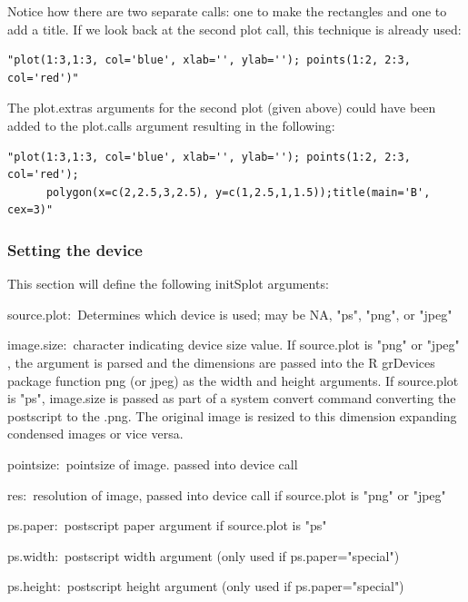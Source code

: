 \documentclass[]{article}
\begin{document}
\indent Notice how there are two separate calls: one to make the rectangles and one to add a title.  If we look back at the second plot call, this technique is already used:

\begin{verbatim}
"plot(1:3,1:3, col='blue', xlab='', ylab=''); points(1:2, 2:3, col='red')"
\end{verbatim}

\indent The plot.extras arguments for the second plot (given above) could have been added to the plot.calls argument resulting in the following:

\begin{verbatim}
"plot(1:3,1:3, col='blue', xlab='', ylab=''); points(1:2, 2:3, col='red');
      polygon(x=c(2,2.5,3,2.5), y=c(1,2.5,1,1.5));title(main='B', cex=3)"
\end{verbatim}



\subsubsection{Setting the device}

This section will define the following initSplot arguments:

\begin{description}
   \item{source.plot:~}{Determines which device is used; may be NA, "ps", "png", or "jpeg"}
   \item{image.size:~}{character indicating device size value. If source.plot is "png" or "jpeg" , the argument is parsed and the dimensions are passed into the R grDevices package function png (or jpeg) as the width and height arguments. If source.plot is "ps", image.size is passed as part of a system convert command converting the postscript to the .png. The original image is resized to this dimension expanding condensed images or vice versa. }
   \item{pointsize:~}{pointsize of image. passed into device call}
   \item{res:~}{resolution of image, passed into device call if source.plot is "png" or "jpeg"}
   \item{ps.paper:~}{postscript paper argument if source.plot is "ps"}
   \item{ps.width:~}{postscript width argument (only used if ps.paper="special")}
   \item{ps.height:~}{postscript height argument (only used if ps.paper="special")}
\end{description}
\end{document}
